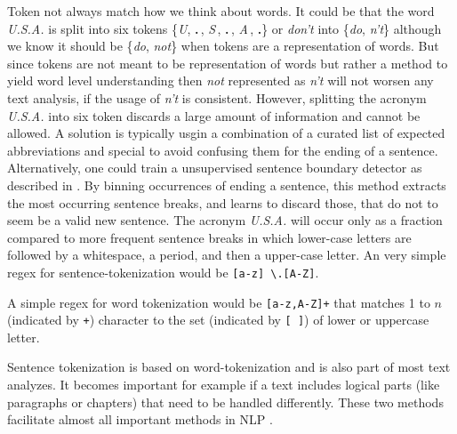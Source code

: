 Token not always match how we think about words. It could be that the word \textit{U.S.A.} is split into six tokens \{\textit{U}, \textbf{.}\,, \textit{S}\,, \textbf{.}\,, \textit{A}\,, \textbf{.}\} or \textit{don't} into \{\textit{do}, \textit{n't}\} although we know it should be \{\textit{do}, \textit{not}\} when tokens are a representation of words. But since tokens are not meant to be representation of words but rather a method to yield word level understanding then \textit{not} represented as \textit{n't} will not worsen any text analysis, if the usage of \textit{n't} is consistent. However, splitting the acronym \textit{U.S.A.} into six token discards a large amount of information and cannot be allowed. A solution is typically usgin a combination of a curated list of expected abbreviations and special to avoid confusing them for the ending of a sentence. Alternatively, one could train a unsupervised sentence boundary detector as described in \cite{Kiss2006}. By binning occurrences of ending a sentence, this method extracts the most occurring sentence breaks, and learns to discard those, that do not to seem be a valid new sentence. The acronym \textit{U.S.A.} will occur only as a fraction compared to more frequent sentence breaks in which lower-case letters are followed by a whitespace, a period, and then a upper-case letter. An very simple regex for sentence-tokenization would be \texttt{[a-z] \textbackslash.[A-Z]}.

A simple regex for word tokenization would be \texttt{[a-z,A-Z]+} that matches 1 to $n$ (indicated by \texttt{+}) character to the set (indicated by \texttt{[ ]}) of lower or uppercase letter.

Sentence tokenization is based on word-tokenization and is also part of most text analyzes. It becomes important for example if a text includes logical parts (like paragraphs or chapters) that need to be handled differently.
These two methods facilitate almost all important methods in NLP \citep{Webster1992}.

